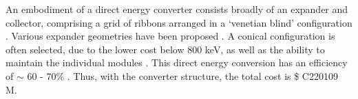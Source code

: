 \begin{table}[h]
    \centering
    \caption{Cost Table}
    \label{tab:cost-table}
\end{table}

An embodiment of a direct energy converter consists broadly of an expander and collector, comprising a grid of ribbons arranged in a `venetian blind' configuration \cite{post1970mirror}. Various expander geometries have been proposed \cite{post1970mirror}. A conical configuration is often selected, due to the lower cost below 800 keV, as well as the ability to maintain the individual modules \cite{barr1974preliminary}. This direct energy conversion has an efficiency of $\sim$ 60 - 70\% \cite{moir1973venetian}.   Thus, with the converter structure, the total cost is \$ C220109 M.
